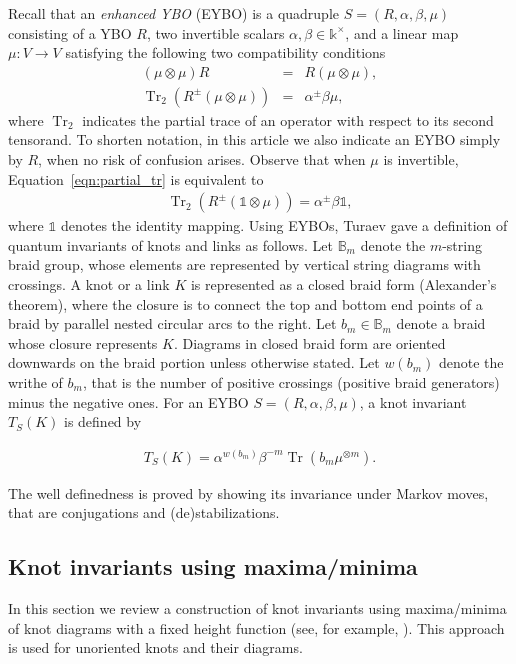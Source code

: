 \documentclass[11pt,fleqn]{amsart} %
\DeclareMathOperator{\tr}{Tr}
\begin{document}
Recall \cite{Tur} that an {\it enhanced YBO} (EYBO) is a quadruple $S = (R, \alpha, \beta, \mu)$ consisting of a YBO $R$, two invertible scalars $\alpha, \beta \in \mathbb k^\times$, and a linear map $\mu: V\longrightarrow V$ satisfying the following two compatibility conditions
\begin{eqnarray}
		(\mu\otimes \mu) R &=& R (\mu\otimes \mu),\label{eqn:mu_comm}\\
		\tr_2(R^{\pm}(\mu\otimes \mu)) &=& \alpha^\pm\beta\mu, \label{eqn:partial_tr}
\end{eqnarray}
where $\tr_2$ indicates the partial trace of an operator with respect to its second tensorand. To shorten notation, in this article we also indicate an EYBO simply by $R$, when no risk of confusion arises. Observe that when $\mu$ is invertible, Equation~\eqref{eqn:partial_tr} is equivalent to
\begin{eqnarray}
		\tr_2(R^{\pm}(\mathbb 1\otimes \mu)) = \alpha^{\pm}\beta \mathbb 1,
\end{eqnarray}
 where $\mathbb 1$ denotes the identity mapping. 
Using EYBOs, Turaev \cite{Tur} gave a definition of quantum invariants of knots and links as follows.
Let $\mathbb B_m$ denote the $m$-string braid group, whose elements are represented by vertical string diagrams
with crossings. 
A knot or a link $K$ is represented as a closed braid form (Alexander's theorem), where 
the closure is to connect the top and bottom end points of a braid by parallel nested circular arcs to the right.
Let $b_m  \in \mathbb B_m$ denote a braid whose closure represents $K$. Diagrams in closed braid form are oriented downwards on the braid portion unless otherwise stated. 
Let $w(b_m)$ denote the writhe  of $b_m$, that is the number of positive crossings (positive braid generators) minus the negative ones. For an EYBO $S=(R, \alpha, \beta, \mu)$, a knot invariant $T_S(K)$ is defined by 


\begin{eqnarray}
		T_S(K) = \alpha^{w(b_m)} \beta^{-m}\tr(b_m \mu^{\otimes m}). 
\end{eqnarray}

The well definedness is proved by showing its invariance under Markov moves, that are conjugations and (de)stabilizations. 


\subsection{Knot invariants using maxima/minima}
In this section we review a construction of knot invariants using maxima/minima of knot diagrams with a fixed height function (see, for example, \cite{K&P}). 
 This approach is used for unoriented knots and their diagrams. 
\end{document}
